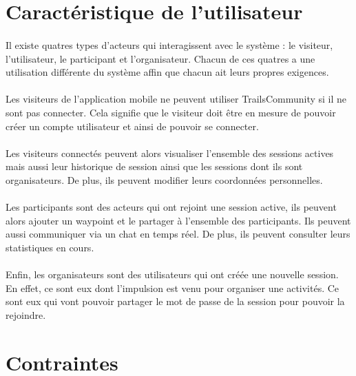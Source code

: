 \documentclass[titlepage, 12pt]{report}
\begin{document}
\section{Caractéristique de l'utilisateur}

\paragraph{}Il existe quatres types d'acteurs qui interagissent avec le système : le visiteur, l'utilisateur, le participant et l'organisateur. Chacun de ces quatres a une utilisation différente du système affin que chacun ait leurs propres exigences.

\paragraph{}Les visiteurs de l'application mobile ne peuvent utiliser TrailsCommunity si il ne sont pas connecter. Cela signifie que le visiteur doit être en mesure de pouvoir créer un compte utilisateur et ainsi de pouvoir se connecter.

\paragraph{}Les visiteurs connectés peuvent alors visualiser l'ensemble des sessions actives mais aussi leur historique de session ainsi que les sessions dont ils sont organisateurs.
De plus, ils peuvent modifier leurs coordonnées personnelles.

\paragraph{}Les participants sont des acteurs qui ont rejoint une session active, ils peuvent alors ajouter un waypoint et le partager à l'ensemble des participants. Ils peuvent aussi communiquer via un chat en temps réel. De plus, ils peuvent consulter leurs statistiques en cours.

\paragraph{}Enfin, les organisateurs sont des utilisateurs qui ont créée une nouvelle session. En effet, ce sont eux dont l'impulsion est venu pour organiser une activités. Ce sont eux qui vont pouvoir partager le mot de passe de la session pour pouvoir la rejoindre.

\section{Contraintes}
\end{document}
